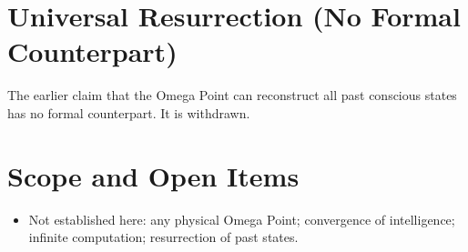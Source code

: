 \documentclass[11pt, a4paper]{article}
\begin{document}
\section{Universal Resurrection (No Formal Counterpart)}
The earlier claim that the Omega Point can reconstruct all past conscious states has no formal counterpart. It is withdrawn.

\section{Scope and Open Items}
\begin{itemize}
  \item Not established here: any physical Omega Point; convergence of intelligence; infinite computation; resurrection of past states.
\end{itemize}
\end{document}
